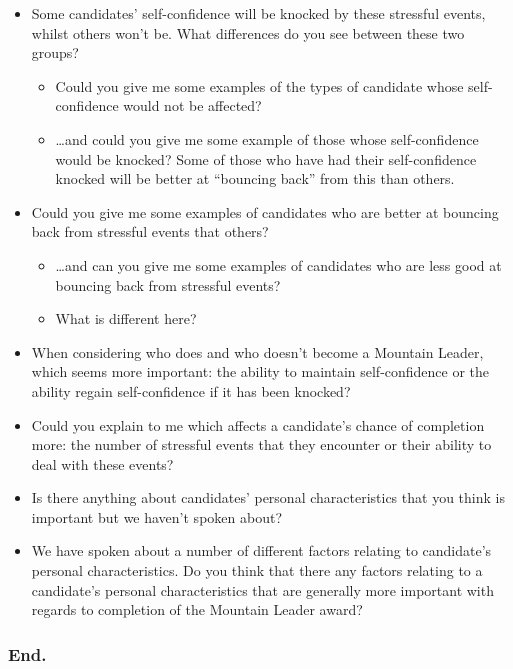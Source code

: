 \documentclass[
  12pt,
  a4paper,
]{book}
\providecommand{\tightlist}{%
  \setlength{\itemsep}{0pt}\setlength{\parskip}{0pt}}
\begin{document}
\begin{itemize}
\tightlist
\item
  Some candidates' self-confidence will be knocked by these stressful events, whilst others won't be. What differences do you see between these two groups?

  \begin{itemize}
  \tightlist
  \item
    Could you give me some examples of the types of candidate whose self-confidence would not be affected?
  \item
    \ldots and could you give me some example of those whose self-confidence would be knocked?
    Some of those who have had their self-confidence knocked will be better at ``bouncing back'' from this than others.
  \end{itemize}
\item
  Could you give me some examples of candidates who are better at bouncing back from stressful events that others?

  \begin{itemize}
  \tightlist
  \item
    \ldots and can you give me some examples of candidates who are less good at bouncing back from stressful events?
  \item
    What is different here?
  \end{itemize}
\item
  When considering who does and who doesn't become a Mountain Leader, which seems more important: the ability to maintain self-confidence or the ability regain self-confidence if it has been knocked?
\item
  Could you explain to me which affects a candidate's chance of completion more: the number of stressful events that they encounter or their ability to deal with these events?
\item
  Is there anything about candidates' personal characteristics that you think is important but we haven't spoken about?
\item
  We have spoken about a number of different factors relating to candidate's personal characteristics. Do you think that there any factors relating to a candidate's personal characteristics that are generally more important with regards to completion of the Mountain Leader award?
\end{itemize}

\hypertarget{end.}{%
\subsubsection{End.}\label{end.}}
\end{document}
